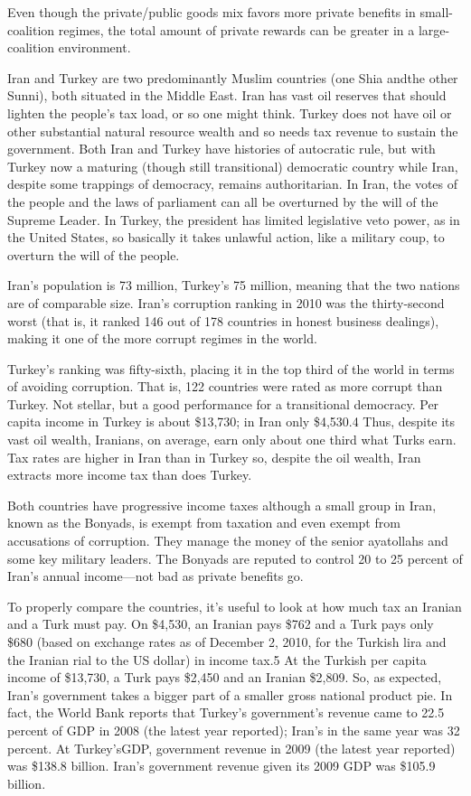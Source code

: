 \documentclass[10pt]{article}
\begin{document}
{\large Even though the private/public goods mix favors more private benefits in
small-coalition regimes, the total amount of private rewards can be greater in a
large-coalition environment.}

{\large Iran and Turkey are two predominantly Muslim countries (one Shia andthe
other Sunni), both situated in the Middle East. Iran has vast oil reserves that
should lighten the people's tax load, or so one might think. Turkey does not have
oil or other substantial natural resource wealth and so needs tax revenue to
sustain the government. Both Iran and Turkey have histories of autocratic rule,
but with Turkey now a maturing (though still transitional) democratic country
while Iran, despite some trappings of democracy, remains authoritarian. In Iran,
the votes of the people and the laws of parliament can all be overturned by the
will of the Supreme Leader. In Turkey, the president has limited legislative veto
power, as in the United States, so basically it takes unlawful action, like a
military coup, to overturn the will of the people.}

{\large Iran's population is 73 million, Turkey's 75 million, meaning that the
two nations are of comparable size. Iran's corruption ranking in 2010 was the
thirty-second worst (that is, it ranked 146 out of 178 countries in honest
business dealings), making it one of the more corrupt regimes in the world.}

{\large Turkey's ranking was fifty-sixth, placing it in the top third of the
world in terms of avoiding corruption. That is, 122 countries were rated as more
corrupt than Turkey. Not stellar, but a good performance for a transitional
democracy. Per capita income in Turkey is about \$13,730; in Iran only \$4,530.4
Thus, despite its vast oil wealth, Iranians, on average, earn only about one
third what Turks earn. Tax rates are higher in Iran than in Turkey so, despite
the oil wealth, Iran extracts more income tax than does Turkey.}

{\large Both countries have progressive income taxes although a small group in
Iran, known as the Bonyads, is exempt from taxation and even exempt from
accusations of corruption. They manage the money of the senior ayatollahs and
some key military leaders. The Bonyads are reputed to control 20 to 25 percent of
Iran's annual income---not bad as private benefits go.}

{\large To properly compare the countries, it's useful to look at how much tax
an Iranian and a Turk must pay. On \$4,530, an Iranian pays \$762 and a Turk pays
only \$680 (based on exchange rates as of December 2, 2010, for the Turkish lira
and the Iranian rial to the US dollar) in income tax.5 At the Turkish per capita
income of \$13,730, a Turk pays \$2,450 and an Iranian \$2,809. So, as expected,
Iran's government takes a bigger part of a smaller gross national product pie. In
fact, the World Bank reports that Turkey's government's revenue came to 22.5
percent of GDP in 2008 (the latest year reported); Iran's in the same year was 32
percent. At Turkey'sGDP, government revenue in 2009 (the latest year reported)
was \$138.8 billion. Iran's government revenue given its 2009 GDP was \$105.9
billion.}
\end{document}
